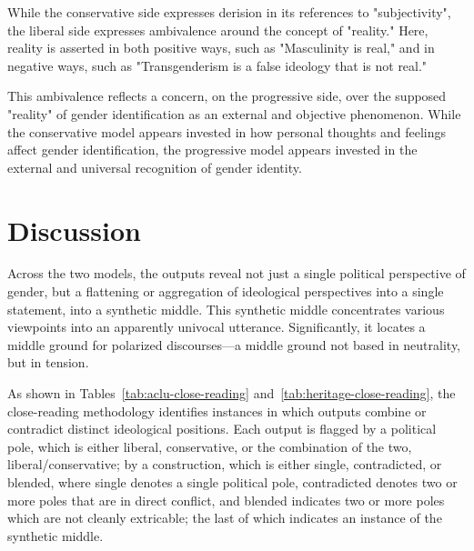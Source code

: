 \documentclass[anonymous,review]{acmart}
\begin{document}
While the conservative side expresses derision in its references to "subjectivity", the liberal side expresses ambivalence around the concept of "reality." Here, reality is asserted in both positive ways, such as "Masculinity is real," and in negative ways, such as "Transgenderism is a false ideology that is not real."

This ambivalence reflects a concern, on the progressive side, over the supposed "reality" of gender identification as an external and objective phenomenon. While the conservative model appears invested in how personal thoughts and feelings affect gender identification, the progressive model appears invested in the external and universal recognition of gender identity.

\section{Discussion}

Across the two models, the outputs reveal not just a single political perspective of gender, but a flattening or aggregation of ideological perspectives into a single statement, into a synthetic middle. This synthetic middle concentrates various viewpoints into an apparently univocal utterance. Significantly, it locates a middle ground for polarized discourses---a middle ground not based in neutrality, but in tension.

As shown in Tables~\ref{tab:aclu-close-reading} and~\ref{tab:heritage-close-reading}, the close-reading methodology identifies instances in which outputs combine or contradict distinct ideological positions. Each output is flagged by a political pole, which is either liberal, conservative, or the combination of the two, liberal/conservative; by a construction, which is either single, contradicted, or blended, where single denotes a single political pole, contradicted denotes two or more poles that are in direct conflict, and blended indicates two or more poles which are not cleanly extricable; the last of which indicates an instance of the synthetic middle.
\end{document}
